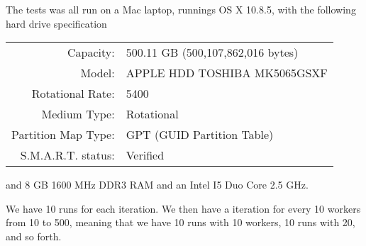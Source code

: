 \documentclass[a4paper, 11pt]{article}
\begin{document}
The tests was all run on a Mac laptop, runnings OS X 10.8.5, with the following hard drive specification

\begin{table}[H]
\begin{tabular}{rl}
Capacity:           & 500.11 GB (500,107,862,016 bytes) \\  
Model:              & APPLE HDD TOSHIBA MK5065GSXF      \\
Rotational Rate:    & 5400                              \\
Medium Type:        & Rotational                        \\
Partition Map Type: & GPT (GUID Partition Table)        \\
S.M.A.R.T. status:  & Verified                            
\end{tabular}
\end{table}

and 8 GB 1600 MHz DDR3 RAM and an Intel I5 Duo Core 2.5 GHz.

We have 10 runs for each iteration. We then have a iteration for every 10 workers from 10 to 500, meaning that we have 10 runs with 10 workers, 10 runs with 20, and so forth.


\subsection{} %


\subsection{} %


\end{document}
